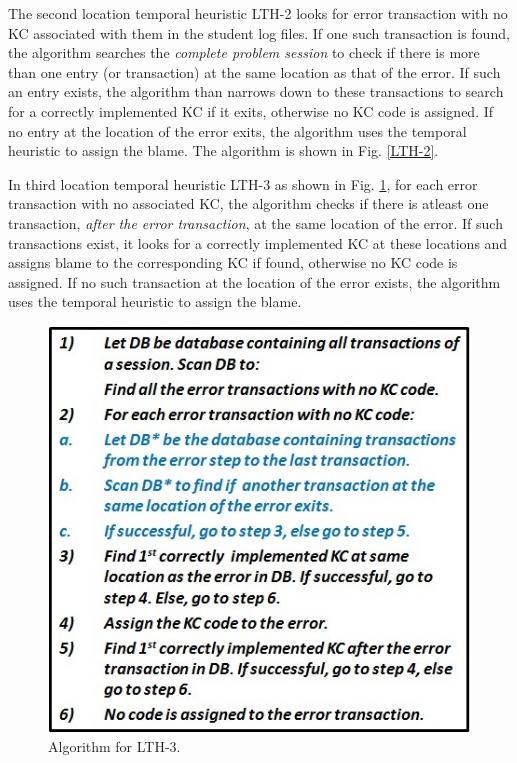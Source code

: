 \documentclass[conference]{IEEEtran}
\begin{document}
The second location temporal heuristic LTH-2 looks for error transaction with no KC associated with them in the student log files. If one such transaction is found, the algorithm searches the \textit{complete problem session} to check if there is more than one entry (or transaction) at the same location as that of the error. If such an entry exists, the algorithm than narrows down to these transactions to search for a correctly implemented KC if it exits, otherwise no KC code is assigned. If no entry at the location of the error exits, the algorithm uses the temporal heuristic to assign the blame. The algorithm is shown in Fig. \ref{LTH-2}.

In third location temporal heuristic LTH-3 as shown in Fig. \ref{LTH-3}, for each error transaction with no associated KC, the algorithm checks if there is atleast one transaction, \textit{after the error transaction}, at the same location of the error. If such transactions exist, it looks for a correctly implemented KC at these locations and assigns blame to the corresponding KC if found, otherwise no KC code is assigned. If no such transaction at the location of the error exists, the algorithm uses the temporal heuristic to assign the blame.

\begin{figure}
\centering
\includegraphics[scale=0.7]{LTH-3.jpg}
\caption{Algorithm for LTH-3.}
\label{LTH-3}
\end{figure}
\end{document}
